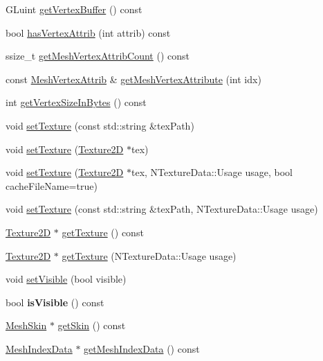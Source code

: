 \begin{DoxyCompactItemize}
\item 
G\+Luint \hyperlink{classMesh_a6424c1f70f73adcc51b23cee023b00c4}{get\+Vertex\+Buffer} () const
\item 
bool \hyperlink{classMesh_adb4449d816ec9935e576cdf99a18b7c1}{has\+Vertex\+Attrib} (int attrib) const
\item 
ssize\+\_\+t \hyperlink{classMesh_afc2d755d1c586b16983e951d1c0af38b}{get\+Mesh\+Vertex\+Attrib\+Count} () const
\item 
const \hyperlink{structMeshVertexAttrib}{Mesh\+Vertex\+Attrib} \& \hyperlink{classMesh_a8ff20e7d894aa8aeca8f16bbd16f6bc4}{get\+Mesh\+Vertex\+Attribute} (int idx)
\item 
int \hyperlink{classMesh_ac76eaa9d09b9198494e48c4323ae1628}{get\+Vertex\+Size\+In\+Bytes} () const
\item 
void \hyperlink{classMesh_a2840f1e3e43c12acf51af1e34398a9a2}{set\+Texture} (const std\+::string \&tex\+Path)
\item 
void \hyperlink{classMesh_aa3492c9c06f12e024e2b7e1ec6258e0a}{set\+Texture} (\hyperlink{classTexture2D}{Texture2D} $\ast$tex)
\item 
void \hyperlink{classMesh_ae39c726ae3c302a5f6bcf8cb31ee7897}{set\+Texture} (\hyperlink{classTexture2D}{Texture2D} $\ast$tex, N\+Texture\+Data\+::\+Usage usage, bool cache\+File\+Name=true)
\item 
void \hyperlink{classMesh_ac5afa042166c9f976551fb638611eb12}{set\+Texture} (const std\+::string \&tex\+Path, N\+Texture\+Data\+::\+Usage usage)
\item 
\hyperlink{classTexture2D}{Texture2D} $\ast$ \hyperlink{classMesh_a61b42530666a384edab7e03dd480e15c}{get\+Texture} () const
\item 
\hyperlink{classTexture2D}{Texture2D} $\ast$ \hyperlink{classMesh_a814f535d4ce6b3243d3319aa18788ee8}{get\+Texture} (N\+Texture\+Data\+::\+Usage usage)
\item 
void \hyperlink{classMesh_a4b1d195f81afe1429d5fdffeaab2a25b}{set\+Visible} (bool visible)
\item 
\mbox{\label{classMesh_aaeec81b4b67053332bb0744a1d44449f}} 
bool {\bfseries is\+Visible} () const
\item 
\hyperlink{classMeshSkin}{Mesh\+Skin} $\ast$ \hyperlink{classMesh_a2d8bd33f1b0978afe7fbc37359b7e8a9}{get\+Skin} () const
\item 
\hyperlink{classMeshIndexData}{Mesh\+Index\+Data} $\ast$ \hyperlink{classMesh_abbe2d7d3d9cbefc55576375fdca32ecd}{get\+Mesh\+Index\+Data} () const

\end{DoxyCompactItemize}
